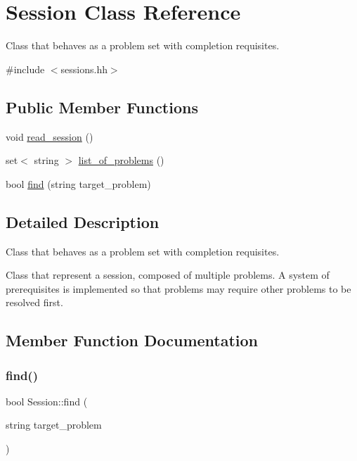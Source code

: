 \hypertarget{classSession}{}\section{Session Class Reference}
\label{classSession}


Class that behaves as a problem set with completion requisites.  




{\ttfamily \#include $<$sessions.\+hh$>$}

\subsection*{Public Member Functions}
\begin{DoxyCompactItemize}
\item 
void \hyperlink{classSession_a75f5a103f7251936bde1183acae2b97e}{read\+\_\+session} ()
\item 
set$<$ string $>$ \hyperlink{classSession_a571f2f08abc58c6670c78b922ffaade4}{list\+\_\+of\+\_\+problems} ()
\item 
bool \hyperlink{classSession_a004fcd4b4d5030cd7e48afe3444a69d4}{find} (string target\+\_\+problem)
\end{DoxyCompactItemize}


\subsection{Detailed Description}
Class that behaves as a problem set with completion requisites. 

Class that represent a session, composed of multiple problems. A system of prerequisites is implemented so that problems may require other problems to be resolved first. 

\subsection{Member Function Documentation}
\mbox{\label{classSession_a004fcd4b4d5030cd7e48afe3444a69d4}} 
\subsubsection{\texorpdfstring{find()}{find()}}
{\footnotesize\ttfamily bool Session\+::find (\begin{DoxyParamCaption}\item[{string}]{target\+\_\+problem }\end{DoxyParamCaption})}


